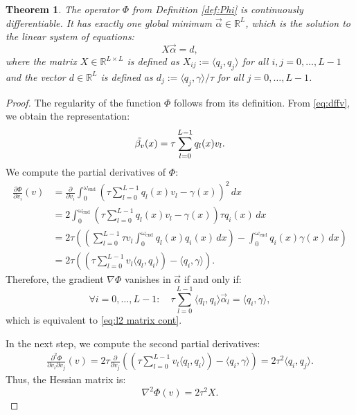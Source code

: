 \documentclass[a4paper,11pt,bibliography=totoc,listof=totoc,headinclude=true,cleardoublepage=empty,oneside]{scrbook}
\newtheorem{theorem}{Theorem}[chapter]
\newcommand{\R}{\mathbb{R}}
\newcommand{\e}{\mathrm{end}}
\begin{document}
\begin{theorem}
    The operator $\Phi$ from Definition \ref{def:Phi} is continuously differentiable. It has exactly one global minimum $\Vec{\alpha} \in \R^L$, which is the solution to the linear system of equations:
    \begin{equation}\label{eq:l2 matrix cont}
        X \Vec{\alpha} = d,
    \end{equation}
    where the matrix $X\in \R^{L\times L}$ is defined as $X_{ij} := \langle q_i, q_j \rangle$ for all $i, j = 0, \dots, L-1$ and the vector $d \in \R^L$ is defined as $d_j := \langle q_j, \gamma\rangle/\tau$ for all $j = 0, \dots, L-1$.
\end{theorem}
\begin{proof}
    The regularity of the function $\Phi$ follows from its definition. From \eqref{eq:dffv}, we obtain the representation: 
    \begin{equation*}
        \Tilde{\beta_v} (x) = \tau \sum_{l=0}^{L-1} q_l(x) v_l.
    \end{equation*}
    We compute the partial derivatives of $\Phi$:
    \begin{align*}
        \frac{\partial \Phi}{\partial v_i}(v) &= \frac{\partial}{\partial v_i} \int_0^{\omega_\e} \left(\tau \sum_{l=0}^{L-1} q_l(x) v_l - \gamma(x) \right)^2 \, dx \\ &= 2 \int_0^{\omega_\e} \left(\tau \sum_{l=0}^{L-1} q_l(x) v_l - \gamma(x) \right)\tau q_i(x) \, dx \\ &= 2 \tau \left(\left(\sum_{l=0}^{L-1} \tau v_l \int_0^{\omega_\e} q_l(x) q_i(x) \, dx \right) - \int_0^{\omega_\e} q_i(x)\gamma(x) \, dx \right) \\ &= 2\tau \left( \left( \tau\sum_{l=0}^{L-1} v_l \langle q_l, q_i\rangle \right) - \langle q_i, \gamma\rangle \right).
    \end{align*}
    Therefore, the gradient $\nabla\Phi$ vanishes in $\Vec{\alpha}$ if and only if:
    \begin{equation*}
        \forall i = 0, \dots, L-1: \quad  \tau\sum_{l=0}^{L-1} \langle q_l, q_i\rangle \Vec{\alpha}_l = \langle q_i, \gamma \rangle,
    \end{equation*}
    which is equivalent to \eqref{eq:l2 matrix cont}.
    
 In the next step, we compute the second partial derivatives:
    \begin{align*}
        \frac{\partial^2 \Phi}{\partial v_i \partial v_j}(v) = 2\tau \frac{\partial}{\partial v_j }  \left( \left( \tau\sum_{l=0}^{L-1} v_l \langle q_l, q_i\rangle \right) - \langle q_i, \gamma\rangle \right) = 2\tau^2 \langle q_i, q_j \rangle.
    \end{align*}
    Thus, the Hessian matrix is:
    \begin{equation*}
        \nabla^2 \Phi(v) = 2 \tau^2 X.
    \end{equation*}
    

\end{proof}
\end{document}
